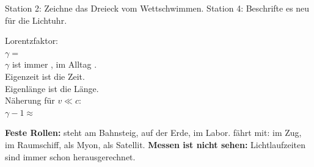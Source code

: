 \documentclass[11pt,a4paper]{article}
\begin{document}
\begin{minipage}[t]{0.5\linewidth}
\vspace{0pt}
\begin{planbox}
{\small Station 2: Zeichne das Dreieck vom Wettschwimmen. Station 4: Beschrifte es neu für die Lichtuhr.}\\[1mm]
\centering{}
\end{planbox}
\end{minipage}\hfill
\begin{minipage}[t]{0.47\linewidth}
\vspace{0pt}
\begin{planbox}
\lueckentext
Lorentzfaktor:\\ $\gamma = $ \\
$\gamma$ ist immer , im Alltag .\\
Eigenzeit ist die  Zeit.\\
Eigenlänge ist die  Länge.\\
Näherung für $v \ll c$:\\ $\gamma - 1 \approx$ 
\end{planbox}
\end{minipage}

\begin{hinweis}
\textbf{Feste Rollen:}  steht am Bahnsteig, auf der Erde, im Labor.  fährt mit: im Zug, im Raumschiff, als Myon, als Satellit. \textbf{Messen ist nicht sehen:} Lichtlaufzeiten sind immer schon herausgerechnet.
\end{hinweis}
\end{document}
